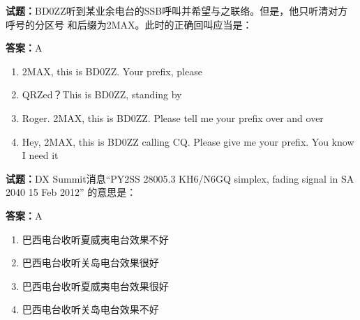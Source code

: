 \documentclass{ctexbook}
\begin{document}




\vspace{1em}

\textbf{试题：}BD0ZZ听到某业余电台的SSB呼叫并希望与之联络。但是，他只听清对方呼号的分区号
和后缀为2MAX。此时的正确回叫应当是： 

\textbf{答案：}A 

\begin{enumerate}[leftmargin=3em]
  \item 2MAX, this is BD0ZZ. Your prefix, please 

  \item QRZed？This is BD0ZZ, standing by 

  \item Roger. 2MAX, this is BD0ZZ. Please tell me your prefix over and over 

  \item Hey, 2MAX, this is BD0ZZ calling CQ. Please give me your prefix. You know I need it 

\end{enumerate}





\vspace{1em}

\textbf{试题：}DX Summit消息“PY2SS 28005.3 KH6/N6GQ simplex, fading signal in SA 2040 15 Feb 2012”
的意思是： 

\textbf{答案：}A 

\begin{enumerate}[leftmargin=3em]
  \item 巴西电台收听夏威夷电台效果不好 

  \item 巴西电台收听关岛电台效果很好 

  \item 巴西电台收听夏威夷电台效果很好 

  \item 巴西电台收听关岛电台效果不好 

\end{enumerate}





\vspace{1em}
\end{document}
